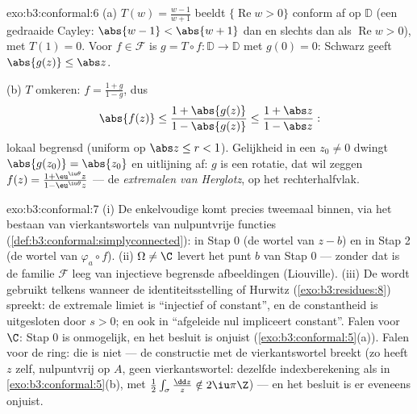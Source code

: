 \begin{solution}{exo:b3:conformal:6}
(a) $T(w) = \frac{w - 1}{w + 1}$ beeldt $\{\operatorname{Re}w >
0\}$ conform af op $\mathbb D$ (een gedraaide Cayley: $\abs{w -
1} < \abs{w + 1}$ dan en slechts dan als $\operatorname{Re}w >
0$), met $T(1) = 0$. Voor $f \in \mathcal F$ is $g = T\circ
f\colon \mathbb D \to \mathbb D$  met $g(0) = 0$:
Schwarz geeft $\abs{g(z)} \leq \abs z$.

(b) $T$ omkeren: $f = \frac{1 + g}{1 - g}$, dus
\[
\abs{f(z)} \leq \frac{1 + \abs{g(z)}}{1 - \abs{g(z)}}
\leq \frac{1 + \abs z}{1 - \abs z} :
\]
lokaal begrensd (uniform op $\abs z \leq r < 1$). Gelijkheid in
een $z_0 \neq 0$ dwingt $\abs{g(z_0)} = \abs{z_0}$ en uitlijning
af: $g$ is een rotatie, dat wil zeggen $f(z) = \frac{1 +
\eu^{\iu\theta}z}{1 - \eu^{\iu\theta}z}$ --- de \emph{extremalen
van Herglotz},  op het rechterhalfvlak.
\end{solution}

\begin{solution}{exo:b3:conformal:7}
(i) De enkelvoudige  komt precies tweemaal binnen, via
het bestaan van  vierkantswortels van nulpuntvrije
functies (\cref{def:b3:conformal:simplyconnected}): in Stap 0 (de
wortel van $z - b$) en in Stap 2 (de wortel van $\varphi_a\circ
f$). (ii) $\Omega \neq \C$ levert het punt $b$ van Stap 0 ---
zonder dat is de familie $\mathcal F$ leeg van injectieve
begrensde afbeeldingen (Liouville). (iii) De  wordt
gebruikt telkens wanneer de identiteitsstelling of Hurwitz
(\cref{exo:b3:residues:8}) spreekt: de extremale limiet is
``injectief of constant'', en de constantheid is uitgesloten door
$s > 0$; en ook in ``afgeleide nul impliceert constant''. Falen
voor $\C$: Stap 0 is onmogelijk, en het besluit is onjuist
(\cref{exo:b3:conformal:5}(a)). Falen voor de ring: die is niet
 --- de constructie met de
vierkantswortel breekt (zo heeft $z$ zelf, nulpuntvrij op $A$,
geen  vierkantswortel: dezelfde indexberekening als in
\cref{exo:b3:conformal:5}(b), met $\frac12\int_\sigma\frac{\dd
z}z \notin 2\iu\pi\Z$) --- en het besluit is er eveneens onjuist.
\end{solution}

